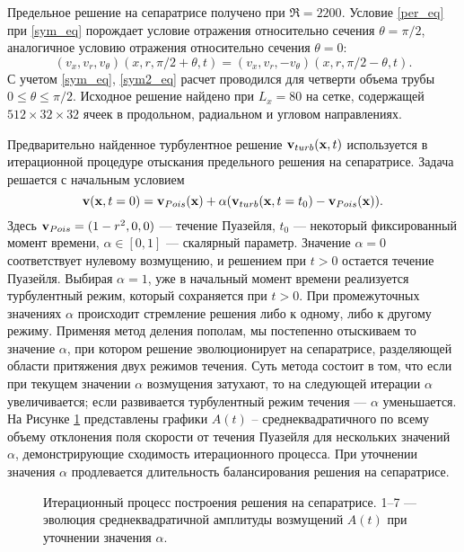 Предельное решение на сепаратрисе получено при $\Re=2200$. Условие \eqref{per_eq} при \eqref{sym_eq} порождает условие отражения относительно сечения $\theta = \pi/2$, аналогичное условию отражения относительно сечения $\theta = 0$:
\begin{equation} \label{sym2_eq}
(v_x, v_r, v_\theta)(x, r, \pi/2 + \theta, t) = (v_x, v_r, -v_\theta)(x, r, \pi / 2 - \theta, t).
\end{equation}
С учетом \eqref{sym_eq}, \eqref{sym2_eq} расчет проводился для четверти объема трубы $0\leqslant\theta\leqslant\pi/2$. Исходное решение найдено при $L_x = 80$ на сетке, содержащей $512 \times 32 \times  32$ ячеек в продольном, радиальном и угловом направлениях. 

Предварительно найденное турбулентное решение $\mathbf{v}_{turb}(\mathbf{x},t)$ используется в итерационной процедуре отыскания предельного решения на сепаратрисе. Задача решается с начальным условием
\begin{equation} \label{edge_init_eq}
\mathbf{v}(\mathbf{x},t=0) = \mathbf{v}_{Pois}(\mathbf{x})+\alpha(\mathbf{v}_{turb}(\mathbf{x},t=t_0) - \mathbf{v}_{Pois}(\mathbf{x})).
\end{equation}
Здесь $\mathbf{v}_{Pois}=(1-r^2,0,0)$ --- течение Пуазейля, $t_0$ --- некоторый фиксированный момент времени, $\alpha \in [0,1]$ --- скалярный параметр. Значение $\alpha=0$ соответствует нулевому возмущению, и решением при $t > 0$ остается течение Пуазейля. Выбирая $\alpha=1$, уже в начальный момент времени реализуется турбулентный режим, который сохраняется при $t > 0$. При промежуточных значениях $\alpha$ происходит стремление решения либо к одному, либо к другому режиму. Применяя метод деления пополам, мы постепенно отыскиваем то значение $\alpha$, при котором решение эволюционирует на сепаратрисе, разделяющей области притяжения двух режимов течения. Суть метода состоит в том, что если при текущем значении $\alpha$ возмущения затухают, то на следующей итерации $\alpha$ увеличивается; если развивается турбулентный режим течения --- $\alpha$ уменьшается. На Рисунке \ref{bisection_pic} представлены графики $A(t)$ – среднеквадратичного по всему объему отклонения поля скорости от течения Пуазейля для нескольких значений $\alpha$, демонстрирующие сходимость итерационного процесса. При уточнении значения $\alpha$ продлевается длительность балансирования решения на сепаратрисе.


\begin{figure}
\caption{Итерационный процесс построения решения на сепаратрисе. 1--7 --- эволюция среднеквадратичной амплитуды возмущений $A(t)$ при уточнении значения $\alpha$.}
\label{bisection_pic}
\end{figure}


